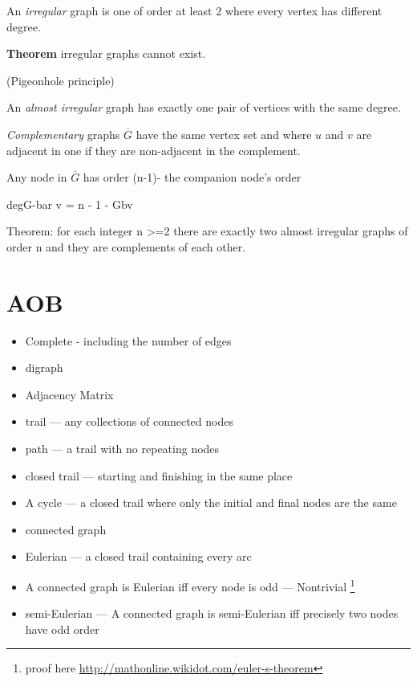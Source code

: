 An \textit{irregular} graph is one of order at least 2 where every vertex has different degree. 

\textbf{Theorem} irregular graphs cannot exist. 

(Pigeonhole principle)

An \textit{almost irregular} graph has exactly one pair of vertices with the same degree. 

\textit{Complementary} graphs $\overline{G}$ have the same vertex set and where $u$ and $v$ are adjacent in one if they are non-adjacent in the complement. 

Any node in $\overline{G}$ has order (n-1)- the companion node’s order 

degG-bar v  = n - 1 - Gbv

Theorem: for each integer n >=2 there are exactly two almost irregular graphs of order n and they are complements of each other. 


\section{AOB}

\begin{itemize}
	\item Complete - including the number of edges
	\item digraph
	\item Adjacency Matrix
	\item trail --- any collections of connected nodes 
	\item path --- a trail with no repeating nodes 
	\item closed trail --- starting and finishing in the same place
	\item A cycle --- a closed trail where only the initial and final nodes are the same 
	\item connected graph 
	\item Eulerian --- a closed trail containing every arc 
	\item A connected graph is Eulerian iff every node is odd --- Nontrivial \footnote{proof here \url{http://mathonline.wikidot.com/euler-s-theorem}}
	\item semi-Eulerian --- A connected graph is semi-Eulerian iff precisely two nodes have odd order  
\end{itemize}
